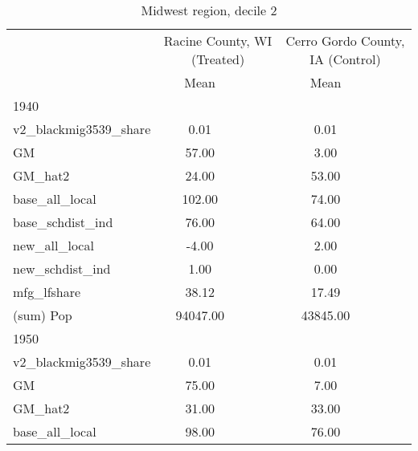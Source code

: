 \begin{table}[htbp]\centering
\def\sym#1{\ifmmode^{#1}\else\(^{#1}\)\fi}
\caption{Midwest region, decile 2 \label{tab1}}
\begin{tabular}{l*{2}{ccc}}
\toprule
                    &\multicolumn{3}{c}{Racine County, WI (Treated)}&\multicolumn{3}{c}{Cerro Gordo County, IA (Control)}\\
                    &        Mean&            &            &        Mean&            &            \\
\midrule
1940                &            &            &            &            &            &            \\
v2\_blackmig3539\_share&        0.01&            &            &        0.01&            &            \\
GM                  &       57.00&            &            &        3.00&            &            \\
GM\_hat2             &       24.00&            &            &       53.00&            &            \\
base\_all\_local      &      102.00&            &            &       74.00&            &            \\
base\_schdist\_ind    &       76.00&            &            &       64.00&            &            \\
new\_all\_local       &       -4.00&            &            &        2.00&            &            \\
new\_schdist\_ind     &        1.00&            &            &        0.00&            &            \\
mfg\_lfshare         &       38.12&            &            &       17.49&            &            \\
(sum) Pop           &    94047.00&            &            &    43845.00&            &            \\
\midrule
1950                &            &            &            &            &            &            \\
v2\_blackmig3539\_share&        0.01&            &            &        0.01&            &            \\
GM                  &       75.00&            &            &        7.00&            &            \\
GM\_hat2             &       31.00&            &            &       33.00&            &            \\
base\_all\_local      &       98.00&            &            &       76.00&            &            \\

\end{tabular}
\end{table}
